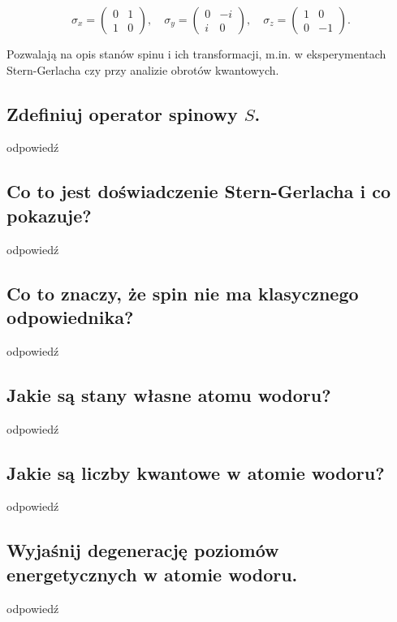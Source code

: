 \[
\sigma_x = \begin{pmatrix}
0 & 1 \\
1 & 0
\end{pmatrix}, \quad
\sigma_y = \begin{pmatrix}
0 & -i \\
i & 0
\end{pmatrix}, \quad
\sigma_z = \begin{pmatrix}
1 & 0 \\
0 & -1
\end{pmatrix}.
\]

Pozwalają na opis stanów spinu i ich transformacji, m.in. w eksperymentach Stern-Gerlacha czy przy analizie obrotów kwantowych.

\subsection{Zdefiniuj operator spinowy $S$.}

odpowiedź

\subsection{Co to jest doświadczenie Stern-Gerlacha i co pokazuje?}

odpowiedź

\subsection{Co to znaczy, że spin nie ma klasycznego odpowiednika?}

odpowiedź

\subsection{Jakie są stany własne atomu wodoru?}

odpowiedź

\subsection{Jakie są liczby kwantowe w atomie wodoru?}

odpowiedź

\subsection{Wyjaśnij degenerację poziomów energetycznych w atomie wodoru.}

odpowiedź

